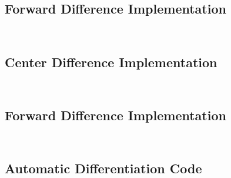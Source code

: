 \documentclass{article}
\begin{document}
\subsection{Forward Difference Implementation}\label{sec:fd_code}
\inputminted[xleftmargin=10pt,linenos]{matlab}{fd_obj_grad.m}
\inputminted[xleftmargin=10pt,linenos]{matlab}{fd_con_grad.m}

\subsection{Center Difference Implementation}\label{sec:cd_code}
\inputminted[xleftmargin=10pt,linenos]{matlab}{cd_obj_grad.m}
\inputminted[xleftmargin=10pt,linenos]{matlab}{cd_con_grad.m}

\subsection{Forward Difference Implementation}\label{sec:cs_code}
\inputminted[xleftmargin=10pt,linenos]{matlab}{cs_obj_grad.m}
\inputminted[xleftmargin=10pt,linenos]{matlab}{cs_con_grad.m}
\subsection{Automatic Differentiation Code}\label{ADcode}
\inputminted[xleftmargin=10pt,linenos]{matlab}{SpringAutoDiff.m}


\end{document}
